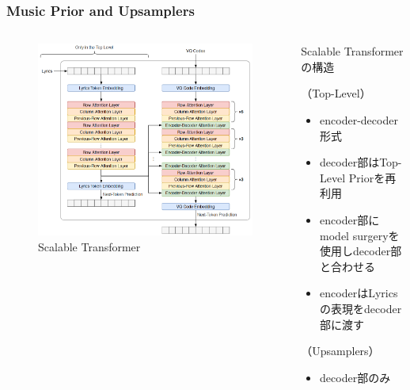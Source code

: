 \documentclass[dvipdfmx]{beamer}
\begin{document}
\begin{frame}
    \frametitle{Music Prior and Upsamplers}
    \begin{columns}
        \begin{column}[T]{0.60\textwidth}
            \begin{figure}
                \begin{center}
                    \includegraphics[scale=0.2]{figure/scalabletransformerarchitecture.png}
                    \caption{Scalable Transformer}
                \end{center}
            \end{figure}
        \end{column}
        \begin{column}[T]{0.40\textwidth}
            Scalable Transformerの構造
            \vspace{\baselineskip}

            （Top-Level）
            \begin{itemize}
                \item encoder-decoder形式
                \item decoder部はTop-Level Priorを再利用
                \item encoder部にmodel surgeryを使用しdecoder部と合わせる
                \item encoderはLyricsの表現をdecoder部に渡す
            \end{itemize}
            \vspace{\baselineskip}

            （Upsamplers）
            \begin{itemize}
                \item decoder部のみ
            \end{itemize}
        \end{column}
    \end{columns}
\end{frame}
\end{document}
